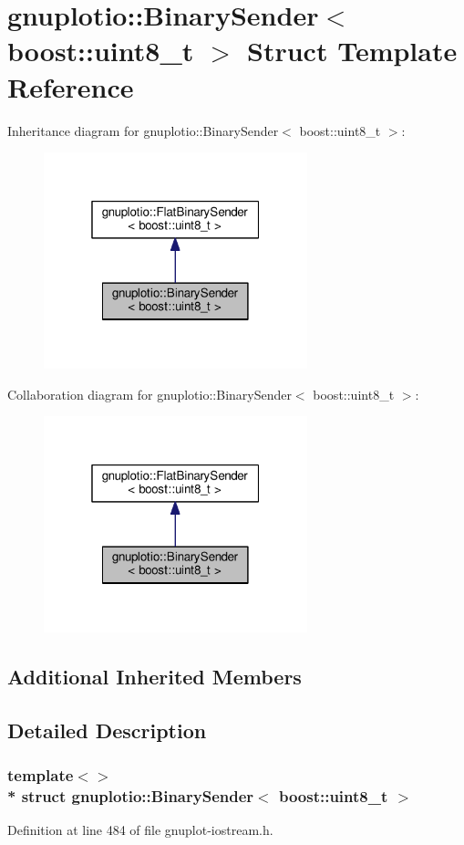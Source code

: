 \hypertarget{structgnuplotio_1_1_binary_sender_3_01boost_1_1uint8__t_01_4}{}\section{gnuplotio\+:\+:Binary\+Sender$<$ boost\+:\+:uint8\+\_\+t $>$ Struct Template Reference}
\label{structgnuplotio_1_1_binary_sender_3_01boost_1_1uint8__t_01_4}


Inheritance diagram for gnuplotio\+:\+:Binary\+Sender$<$ boost\+:\+:uint8\+\_\+t $>$\+:
\nopagebreak
\begin{figure}[H]
\begin{center}
\leavevmode
\includegraphics[width=217pt]{structgnuplotio_1_1_binary_sender_3_01boost_1_1uint8__t_01_4__inherit__graph}
\end{center}
\end{figure}


Collaboration diagram for gnuplotio\+:\+:Binary\+Sender$<$ boost\+:\+:uint8\+\_\+t $>$\+:
\nopagebreak
\begin{figure}[H]
\begin{center}
\leavevmode
\includegraphics[width=217pt]{structgnuplotio_1_1_binary_sender_3_01boost_1_1uint8__t_01_4__coll__graph}
\end{center}
\end{figure}
\subsection*{Additional Inherited Members}


\subsection{Detailed Description}
\subsubsection*{template$<$$>$\\*
struct gnuplotio\+::\+Binary\+Sender$<$ boost\+::uint8\+\_\+t $>$}



Definition at line 484 of file gnuplot-\/iostream.\+h.

